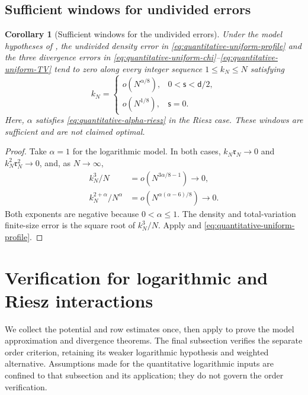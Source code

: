 \documentclass[11pt,reqno]{amsart}
\numberwithin{equation}{section}
\theoremstyle{plain}
\newtheorem{cor}[cor]{Corollary}
\theoremstyle{remark}
\renewcommand{\d}{\mathsf{d}}
\newcommand{\s}{\mathsf{s}}
\begin{document}
\subsection{Sufficient windows for undivided errors}
\label{subsubsec:exact-profile-growing-errors}

\begin{cor}[Sufficient windows for the undivided errors]
\label{cor:quantitative-literal-growing-window}
Under the model hypotheses of ,
the undivided density error in \eqref{eq:quantitative-uniform-profile} and
the three divergence errors in
\eqref{eq:quantitative-uniform-chi}--\eqref{eq:quantitative-uniform-TV}
tend to zero along every integer sequence $1\leq k_N\leq N$ satisfying
\begin{equation}\label{eq:quantitative-literal-growing-window}
 k_N=\begin{cases}
 o(N^{\alpha/8}),&0<\s<\d/2,\\
 o(N^{1/8}),&\s=0.
 \end{cases}
\end{equation}
Here, $\alpha$ satisfies \eqref{eq:quantitative-alpha-riesz} in the Riesz
case.  These windows are sufficient and are not claimed optimal.
\end{cor}
\begin{proof}
Take $\alpha=1$ for the logarithmic model.  In both cases,
$k_N\mathfrak r_N\to0$ and $k_N^2\mathfrak r_N^2\to0$, and, as $N\to\infty$,
\begin{align}
 k_N^3/N&=o(N^{3\alpha/8-1})\longrightarrow0,
 \label{eq:signed-window-cubic}\\
 k_N^{2+\alpha}/N^\alpha
 &=o(N^{\alpha(\alpha-6)/8})\longrightarrow0.
 \label{eq:signed-window-entropy}
\end{align}
Both exponents are negative because $0<\alpha\leq1$.
The density and total-variation finite-size error is the square root of
$k_N^3/N$.  Apply  and
\eqref{eq:quantitative-uniform-profile}.
\end{proof}
\section{Verification for logarithmic and Riesz interactions}
\label{sec:verification-log-riesz}

We collect the potential and row estimates once, then apply  to prove the model approximation and divergence theorems.  The final subsection verifies the separate order criterion, retaining its weaker logarithmic hypothesis and weighted alternative.  Assumptions made for the quantitative logarithmic inputs are confined to that subsection and its application; they do not govern the order verification.
\end{document}
